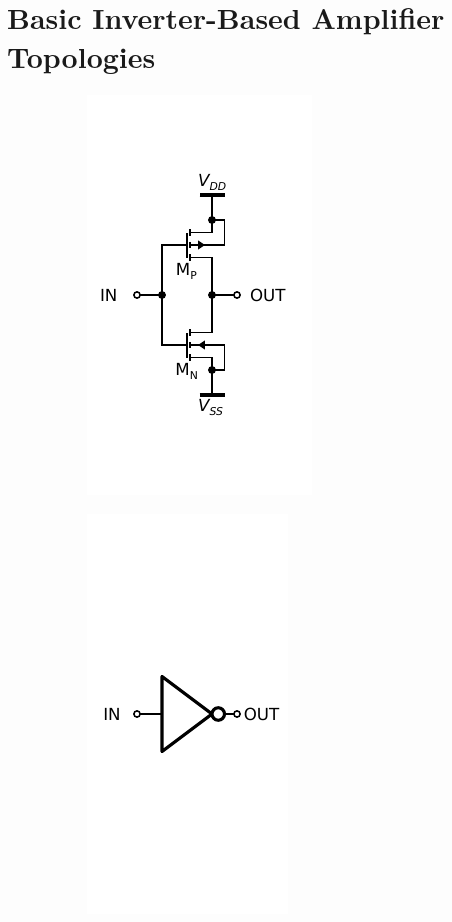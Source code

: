 \documentclass[conference]{IEEEtran}
\begin{document}
\FloatBarrier

\section{Basic Inverter-Based Amplifier Topologies}\label{sc:basic}

\begin{figure}[htbp]
	\centering
	\begin{subfigure}[b]{0.49\columnwidth}
		\centerline{\includegraphics[scale=0.50]{circuits/inv_sch.pdf}}
		\caption{}
		\label{fig:inv:schematic}
	\end{subfigure}
	\begin{subfigure}[b]{0.49\columnwidth}
		\centerline{\includegraphics[scale=0.50]{circuits/inv_symbol.pdf}}

\end{subfigure}
\end{figure}
\end{document}
